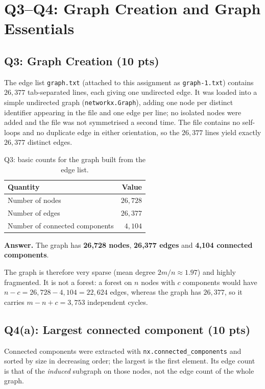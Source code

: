 \section{Q3--Q4: Graph Creation and Graph Essentials}

\subsection*{Q3: Graph Creation (10 pts)}

The edge list \texttt{graph.txt} (attached to this assignment as
\texttt{graph-1.txt}) contains $26{,}377$ tab-separated lines, each giving one
undirected edge. It was loaded into a simple undirected graph
(\texttt{networkx.Graph}), adding one node per distinct identifier appearing in
the file and one edge per line; no isolated nodes were added and the file was
not symmetrised a second time. The file contains no self-loops and no duplicate
edge in either orientation, so the $26{,}377$ lines yield exactly $26{,}377$
distinct edges.

\begin{table}[ht]
  \centering
  \begin{tabular}{lr}
    \toprule
    Quantity & Value \\
    \midrule
    Number of nodes                & $26{,}728$ \\
    Number of edges                & $26{,}377$ \\
    Number of connected components & $4{,}104$  \\
    \bottomrule
  \end{tabular}
  \caption{Q3: basic counts for the graph built from the edge list.}
  \label{p2:tab:q3}
\end{table}

\noindent\textbf{Answer.} The graph has \textbf{26{,}728 nodes},
\textbf{26{,}377 edges} and \textbf{4{,}104 connected components}.

The graph is therefore very sparse (mean degree $2m/n \approx 1.97$) and highly
fragmented. It is not a forest: a forest on $n$ nodes with $c$ components would
have $n-c = 26{,}728-4{,}104 = 22{,}624$ edges, whereas the graph has
$26{,}377$, so it carries $m-n+c = 3{,}753$ independent cycles.

\subsection*{Q4(a): Largest connected component (10 pts)}

Connected components were extracted with
\texttt{nx.connected\_components} and sorted by size in decreasing order; the
largest is the first element. Its edge count is that of the \emph{induced}
subgraph on those nodes, not the edge count of the whole graph.

